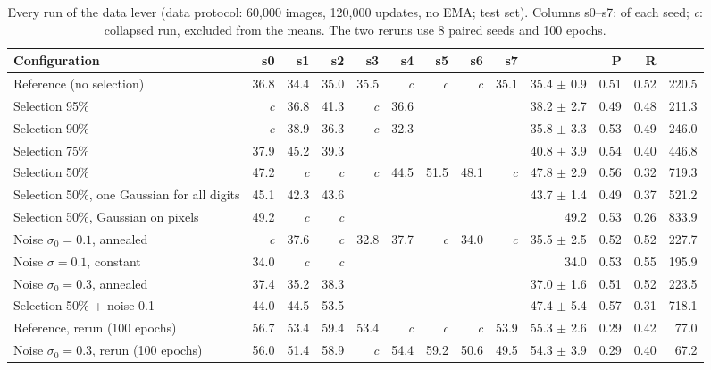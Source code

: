 \begin{table}[H]
\centering
\footnotesize
\setlength{\tabcolsep}{4pt}
\begin{tabular}{lrrrrrrrrrrrr}
\toprule
Configuration & s0 & s1 & s2 & s3 & s4 & s5 & s6 & s7 & \finc{} & P & R & \fcnn{} \\
\midrule
Reference (no selection) & 36.8 & 34.4 & 35.0 & 35.5 & \textit{c} & \textit{c} & \textit{c} & 35.1 & 35.4 $\pm$ 0.9 & 0.51 & 0.52 & 220.5 \\
Selection 95\% & \textit{c} & 36.8 & 41.3 & \textit{c} & 36.6 &  &  &  & 38.2 $\pm$ 2.7 & 0.49 & 0.48 & 211.3 \\
Selection 90\% & \textit{c} & 38.9 & 36.3 & \textit{c} & 32.3 &  &  &  & 35.8 $\pm$ 3.3 & 0.53 & 0.49 & 246.0 \\
Selection 75\% & 37.9 & 45.2 & 39.3 &  &  &  &  &  & 40.8 $\pm$ 3.9 & 0.54 & 0.40 & 446.8 \\
Selection 50\% & 47.2 & \textit{c} & \textit{c} & \textit{c} & 44.5 & 51.5 & 48.1 & \textit{c} & 47.8 $\pm$ 2.9 & 0.56 & 0.32 & 719.3 \\
Selection 50\%, one Gaussian for all digits & 45.1 & 42.3 & 43.6 &  &  &  &  &  & 43.7 $\pm$ 1.4 & 0.49 & 0.37 & 521.2 \\
Selection 50\%, Gaussian on pixels & 49.2 & \textit{c} & \textit{c} &  &  &  &  &  & 49.2 & 0.53 & 0.26 & 833.9 \\
Noise $\sigma_0=0.1$, annealed & \textit{c} & 37.6 & \textit{c} & 32.8 & 37.7 & \textit{c} & 34.0 & \textit{c} & 35.5 $\pm$ 2.5 & 0.52 & 0.52 & 227.7 \\
Noise $\sigma=0.1$, constant & 34.0 & \textit{c} & \textit{c} &  &  &  &  &  & 34.0 & 0.53 & 0.55 & 195.9 \\
Noise $\sigma_0=0.3$, annealed & 37.4 & 35.2 & 38.3 &  &  &  &  &  & 37.0 $\pm$ 1.6 & 0.51 & 0.52 & 223.5 \\
Selection 50\% + noise 0.1 & 44.0 & 44.5 & 53.5 &  &  &  &  &  & 47.4 $\pm$ 5.4 & 0.57 & 0.31 & 718.1 \\
Reference, rerun (100 epochs) & 56.7 & 53.4 & 59.4 & 53.4 & \textit{c} & \textit{c} & \textit{c} & 53.9 & 55.3 $\pm$ 2.6 & 0.29 & 0.42 & 77.0 \\
Noise $\sigma_0=0.3$, rerun (100 epochs) & 56.0 & 51.4 & 58.9 & \textit{c} & 54.4 & 59.2 & 50.6 & 49.5 & 54.3 $\pm$ 3.9 & 0.29 & 0.40 & 67.2 \\
\bottomrule
\end{tabular}
\caption{Every run of the data lever (data protocol: 60,000 images, 120,000 updates, no EMA; test set). Columns s0--s7: \finc{} of each seed; \textit{c}: collapsed run, excluded from the means. The two reruns use 8 paired seeds and 100 epochs.}
\label{tab:supp-data}
\end{table}
